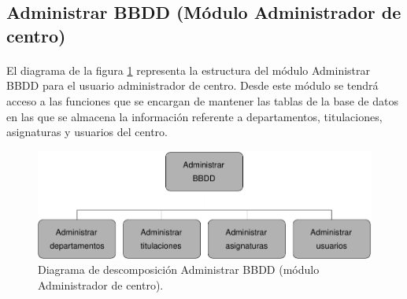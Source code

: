 \subsection{Administrar BBDD (Módulo Administrador de centro)}

  \paragraph{}El diagrama de la figura
  \ref{diagramaDescomposicionAdministrarBBDD-admCentro} representa la estructura
  del módulo Administrar BBDD para el usuario administrador de centro. Desde
  este módulo se tendrá acceso a las funciones que se encargan de mantener las
  tablas de la base de datos en las que se almacena la información referente a
  departamentos, titulaciones, asignaturas y usuarios del centro.

  \begin{figure}[!ht]
    \begin{center}
      \includegraphics[]{11.Disenyo_Arquitectonico/11.2.Diagramas_Descomposicion/11.2.3.Modulo_administrador_centro/AdministrarBBDD/Diagramas/administrar_bbdd.pdf}
      \caption{Diagrama de descomposición Administrar BBDD (módulo Administrador de centro).}
      \label{diagramaDescomposicionAdministrarBBDD-admCentro}
    \end{center}
  \end{figure}

 
 
 
 